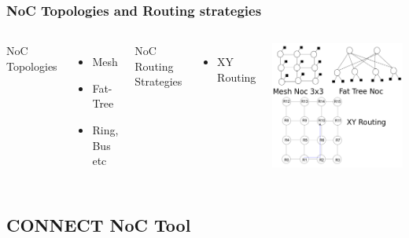 \begin{frame}
  \frametitle{NoC Topologies and Routing strategies}   %
  \begin{columns}[c]
  \column{2in}  %
  NoC Topologies
  \begin{itemize}
  \item Mesh 
  \item Fat-Tree
  \item Ring, Bus etc
  \end{itemize} 
  NoC Routing Strategies
  \begin{itemize}
  \item XY Routing 
  \end{itemize}
  \column{2in}
  \includegraphics[scale=0.3]{./diagram/noc_intro_dia} 
  \end{columns}
\end{frame}



\subsection{CONNECT NoC Tool}


